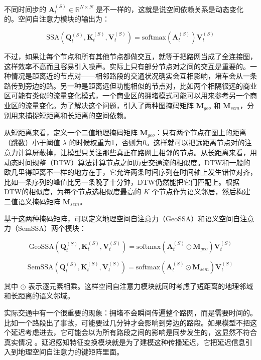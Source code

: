 不同时间步的 $\boldsymbol{A}_t^{(S)} \in \mathbb{R}^{N \times N}$ 是不一样的，这就是说空间依赖关系是动态变化的。空间自注意力模块的输出为：

\begin{equation}
\text{SSA}(\boldsymbol{Q}_t^{(S)}, \boldsymbol{K}_t^{(S)}, \boldsymbol{V}_t^{(S)}) = \text{softmax}(\boldsymbol{A}_t^{(S)}) \boldsymbol{V}_t^{(S)}
\end{equation}

不过，如果让每个节点和所有其他节点都做交互，就等于把路网当成了全连接图，这样效率不高而且容易引入噪声。实际上只有部分节点对之间的交互是重要的。一种情况是距离近的节点对——相邻路段的交通状况确实会互相影响，堵车会从一条路传到旁边的路。另一种是距离远但功能相似的节点对，比如两个相隔很远的商业区可能有类似的流量变化模式，一个商业区的拥堵模式可能可以用来参考另一个商业区的流量变化。为了解决这个问题，引入了两种图掩码矩阵 $\boldsymbol{M}_{geo}$ 和 $\boldsymbol{M}_{sem}$，分别用来捕捉短距离和长距离的空间依赖。

从短距离来看，定义一个二值地理掩码矩阵 $\boldsymbol{M}_{geo}$：只有两个节点在图上的距离（跳数）小于阈值 $\lambda$ 的时候权重为1，否则为0。这样就可以把远距离节点对的注意力计算屏蔽掉，让模型只关注那些真正在路网上相邻的节点。从长距离来看，用动态时间规整（DTW）算法计算节点之间历史交通流的相似度。DTW和一般的欧几里得距离不一样的地方在于，它允许两条时间序列在时间轴上发生错位对齐，比如一条序列的峰值比另一条晚了十分钟，DTW仍然能把它们匹配上。根据DTW的相似度，为每个节点选相似度最高的 $K$ 个节点作为语义邻居，然后构建二值语义掩码矩阵 $\boldsymbol{M}_{sem}$。

基于这两种掩码矩阵，可以定义地理空间自注意力（GeoSSA）和语义空间自注意力（SemSSA）两个模块：

\begin{equation}
\text{GeoSSA}(\boldsymbol{Q}_t^{(S)}, \boldsymbol{K}_t^{(S)}, \boldsymbol{V}_t^{(S)}) = \text{softmax}(\boldsymbol{A}_t^{(S)} \odot \boldsymbol{M}_{geo}) \boldsymbol{V}_t^{(S)}
\end{equation}

\begin{equation}
\text{SemSSA}(\boldsymbol{Q}_t^{(S)}, \boldsymbol{K}_t^{(S)}, \boldsymbol{V}_t^{(S)}) = \text{softmax}(\boldsymbol{A}_t^{(S)} \odot \boldsymbol{M}_{sem}) \boldsymbol{V}_t^{(S)}
\end{equation}

其中 $\odot$ 表示逐元素相乘。这样空间自注意力模块就同时考虑了短距离的地理邻域和长距离的语义邻域。

实际交通中有一个很重要的现象：拥堵不会瞬间传遍整个路网，而是需要时间的。比如一个路段出了事故，可能要过几分钟才会影响到旁边的路段。如果模型不把这个延迟考虑进去，它可能会以为所有路段之间的影响是同步发生的，这显然不符合真实情况 。延迟感知特征变换模块就是为了建模这种传播延迟，它把延迟信息引入到地理空间自注意力的键矩阵里面。

